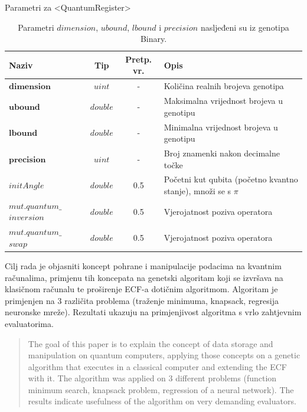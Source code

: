 \documentclass[times, utf8, zavrsni, numeric]{fer}
\begin{document}
\begin{table}[htb]
\caption{Parametri za <QuantumRegister>}
\label{tbl:param_kvareg}
\centering
\caption*{\footnotesize Parametri $dimension$, $ubound$, $lbound$ i $precision$ nasljeđeni su iz genotipa Binary.}
\begin{tabular}{p{3cm}ccp{7cm}} \hline
Naziv & Tip & Pretp. vr. & Opis\\ \toprule
$\textbf{dimension}$ & $uint$ & - & Količina realnih brojeva genotipa \\
$\textbf{ubound}$ & $double$ & - & Maksimalna vrijednost brojeva u genotipu \\
$\textbf{lbound}$ & $double$ & - & Minimalna vrijednost brojeva u genotipu \\
$\textbf{precision}$ & $uint$ & - & Broj znamenki nakon decimalne točke \\
$initAngle$ & $double$ & 0.5 & Početni kut qubita (početno kvantno stanje), množi se s $\pi$ \\
$mut.quantum\_$ $inversion$ & $double$ & 0.5 & Vjerojatnost poziva operatora \\
$mut.quantum\_$ $swap$ & $double$ & 0.5 & Vjerojatnost poziva operatora \\ \bottomrule
\end{tabular}
\end{table}

\clearpage

\begin{sazetak}
Cilj rada je objasniti koncept pohrane i manipulacije podacima na kvantnim računalima, primjenu tih koncepata na genetski algoritam koji se izvršava na klasičnom računalu te proširenje ECF-a dotičnim algoritmom. Algoritam je primjenjen na 3 različita problema (traženje minimuma, knapsack, regresija neuronske mreže). Rezultati ukazuju na primjenjivost algoritma s vrlo zahtjevnim evaluatorima.

\end{sazetak}

\begin{abstract}
The goal of this paper is to explain the concept of data storage and manipulation on quantum computers, applying those concepts on a genetic algorithm that executes in a classical computer and extending the ECF with it. The algorithm was applied on 3 different problems (function minimum search, knapsack problem, regression of a neural network). The results indicate usefulness of the algorithm on very demanding evaluators.

\end{abstract}
\end{document}
